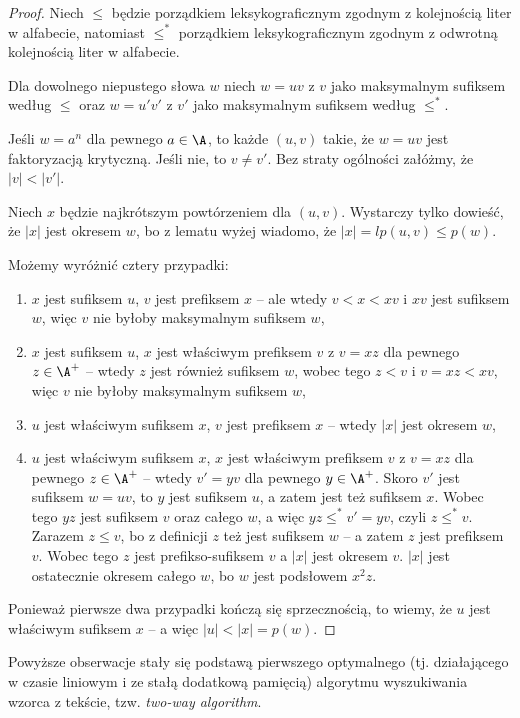 \begin{proof}
  Niech $\le$ będzie porządkiem leksykograficznym zgodnym z kolejnością liter w alfabecie, natomiast $\le^*$ porządkiem leksykograficznym zgodnym z odwrotną kolejnością liter w alfabecie.

  Dla dowolnego niepustego słowa $w$ niech $w = uv$ z $v$ jako maksymalnym sufiksem według $\le$ oraz $w = u'v'$ z $v'$ jako maksymalnym sufiksem według $\le^*$.

  Jeśli $w = a^n$ dla pewnego $a \in \A$, to każde $(u, v)$ takie, że $w = uv$ jest faktoryzacją krytyczną.
  Jeśli nie, to $v \neq v'$. Bez straty ogólności załóżmy, że $|v| < |v'|$.

  Niech $x$ będzie najkrótszym powtórzeniem dla $(u, v)$.
  Wystarczy tylko dowieść, że $|x|$ jest okresem $w$, bo z lematu wyżej wiadomo, że $|x| = lp(u, v) \le p(w)$.

  Możemy wyróżnić cztery przypadki:
  \begin{enumerate}
    \item $x$ jest sufiksem $u$, $v$ jest prefiksem $x$ -- ale wtedy $v < x < xv$ i $xv$ jest sufiksem $w$, więc $v$ nie byłoby maksymalnym sufiksem $w$,
    \item $x$ jest sufiksem $u$, $x$ jest właściwym prefiksem $v$ z $v = xz$ dla pewnego $z \in \A^+$ -- wtedy $z$ jest również sufiksem $w$, wobec tego $z < v$ i $v = x z < x v$, więc $v$ nie byłoby maksymalnym sufiksem $w$,
    \item $u$ jest właściwym sufiksem $x$, $v$ jest prefiksem $x$ -- wtedy $|x|$ jest okresem $w$,
    \item $u$ jest właściwym sufiksem $x$, $x$ jest właściwym prefiksem $v$ z $v = x z$ dla pewnego $z \in \A^+$ -- wtedy $v' = y v$ dla pewnego $y \in \A^+$. Skoro $v'$ jest sufiksem $w = u v$, to $y$ jest sufiksem $u$, a zatem jest też sufiksem $x$. Wobec tego $y z$ jest sufiksem $v$ oraz całego $w$, a więc $y z \le^* v' = y v$, czyli $z \le^* v$. Zarazem $z \le v$, bo z definicji $z$ też jest sufiksem $w$ -- a zatem $z$ jest prefiksem $v$. Wobec tego $z$ jest prefikso-sufiksem $v$ a $|x|$ jest okresem $v$. $|x|$ jest ostatecznie okresem całego $w$, bo $w$ jest podsłowem $x^2 z$.
  \end{enumerate}

  Ponieważ pierwsze dwa przypadki kończą się sprzecznością, to wiemy, że $u$ jest właściwym sufiksem $x$ -- a więc $|u| < |x| = p(w)$.
\end{proof}

Powyższe obserwacje stały się podstawą pierwszego optymalnego (tj. działającego w czasie liniowym i ze stałą dodatkową pamięcią) algorytmu wyszukiwania wzorca z tekście, tzw. \emph{two-way algorithm}.

